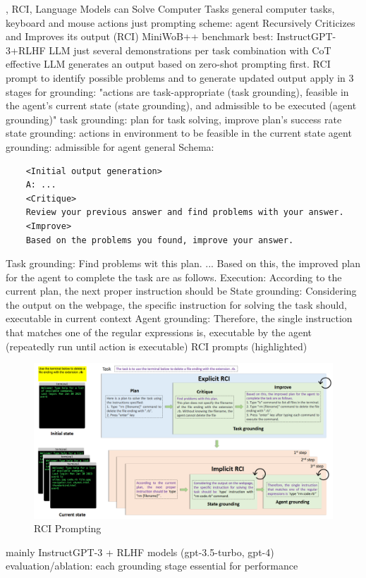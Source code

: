 \documentclass{article}
\begin{document}
\cite{kim_language_2023} , RCI, Language Models can Solve Computer Tasks
general computer tasks, keyboard and mouse actions
just prompting scheme: agent Recursively Criticizes and Improves its output (RCI)
MiniWoB++ benchmark
best: InstructGPT-3+RLHF LLM
just several demonstrations per task
combination with CoT effective
LLM generates an output based on zero-shot prompting first. RCI prompt to identify possible problems and to generate updated output
apply in 3 stages for grounding: "actions are task-appropriate (task grounding), feasible in the agent’s current state (state grounding), and admissible to be executed (agent grounding)"
task grounding: plan for task solving, improve plan's success rate
state grounding: actions in environment to be feasible in the current state 
agent grounding: admissible for agent
general Schema:
\begin{verbatim}
	<Initial output generation>
	A: ...
	<Critique>
	Review your previous answer and find problems with your answer.
	<Improve>
	Based on the problems you found, improve your answer.
\end{verbatim}
Task grounding: Find problems wit this plan. ... Based on this, the improved plan for the agent to complete the task are as follows.
Execution: According to the current plan, the next proper instruction should be
State grounding: Considering the output on the webpage, the specific instruction for solving the task should, executable in current context
Agent grounding: Therefore, the single instruction that matches one of the regular expressions is, executable by the agent (repeatedly run until action is executable)
RCI prompts (highlighted)
\begin{figure}[h]
	\centering
	\includegraphics[width=1.0\linewidth]{RCIPrompting.png}
	\caption{RCI Prompting \cite{kim_language_2023}}
	\label{fig:rciprompting}
\end{figure}
mainly InstructGPT-3 + RLHF models (gpt-3.5-turbo, gpt-4)
evaluation/ablation: each grounding stage essential for performance
\end{document}
